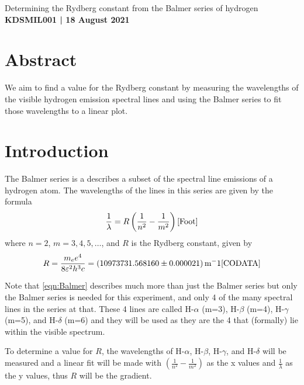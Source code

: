 \documentclass[11pt]{article}
\numberwithin{equation}{section}
\numberwithin{figure}{section}
\numberwithin{table}{section}
\begin{document}
\begin{center}
    {\huge Determining the Rydberg constant from the Balmer series of hydrogen}\\
    \vspace{0.2in}
    \textbf{KDSMIL001 | 18 August 2021}
    
    
    \section*{Abstract}\label{sec:Abstract}
    We aim to find a value for the Rydberg constant by measuring the wavelengths of the visible hydrogen emission spectral lines and using the Balmer series to fit those wavelengths to a linear plot.
\end{center}
    
\section{Introduction}\label{sec:Introduction}
\par The Balmer series is a describes a subset of the spectral line emissions of a hydrogen atom. The wavelengths of the lines in this series are given by the formula
\begin{equation}
    \frac{1}{\lambda}=R\left(\frac{1}{n^2}-\frac{1}{m^2}\right)\cite{Foot}
    \label{eqn:Balmer}
\end{equation}
where $n=2$, $m=3,4,5,\dots$, and $R$ is the Rydberg constant, given by
\begin{equation}
    R=\frac{m_ee^4}{8\varepsilon^2h^3c}=\SI{10973731.568160(21)}{\metre^-1}\cite{CODATA}
    \label{eqn:Rydberg Constant}
\end{equation}
\par Note that \autoref{eqn:Balmer} describes much more than just the Balmer series but only the Balmer series is needed for this experiment, and only 4 of the many spectral lines in the series at that. These 4 lines are called H-$\alpha$ (m=3), H-$\beta$ (m=4), H-$\gamma$ (m=5), and H-$\delta$ (m=6) and they will be used as they are the 4 that (formally) lie within the visible spectrum.
\par To determine a value for $R$, the wavelengths of H-$\alpha$, H-$\beta$, H-$\gamma$, and H-$\delta$ will be measured and a linear fit will be made with $\left(\frac{1}{n^2}-\frac{1}{m^2}\right)$ as the x values and $\frac{1}{\lambda}$ as the y values, thus $R$ will be the gradient.
\end{document}

